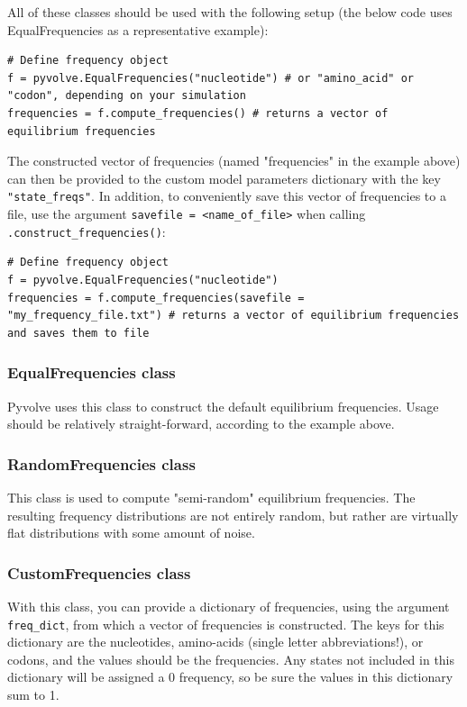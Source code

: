 \documentclass{article}
\newcommand{\code}[1]{\texttt{\small{#1}}}
\begin{document}
All of these classes should be used with the following setup (the below code uses EqualFrequencies as a representative example):
\begin{lstlisting}
# Define frequency object
f = pyvolve.EqualFrequencies("nucleotide") # or "amino_acid" or "codon", depending on your simulation
frequencies = f.compute_frequencies() # returns a vector of equilibrium frequencies
\end{lstlisting}

The constructed vector of frequencies (named "frequencies" in the example above) can then be provided to the custom model parameters dictionary with the key \code{"state\_freqs"}. In addition, to conveniently save this vector of frequencies to a file, use the argument \code{savefile = <name\_of\_file>} when calling \code{.construct\_frequencies()}:
\begin{lstlisting}
# Define frequency object
f = pyvolve.EqualFrequencies("nucleotide")
frequencies = f.compute_frequencies(savefile = "my_frequency_file.txt") # returns a vector of equilibrium frequencies and saves them to file
\end{lstlisting}


\subsubsection{EqualFrequencies class}
Pyvolve uses this class to construct the default equilibrium frequencies. Usage should be relatively straight-forward, according to the example above.

\subsubsection{RandomFrequencies class}
This class is used to compute "semi-random" equilibrium frequencies. The resulting frequency distributions are not entirely random, but rather are virtually flat distributions with some amount of noise.

\subsubsection{CustomFrequencies class}
With this class, you can provide a dictionary of frequencies, using the argument \code{freq\_dict}, from which a vector of frequencies is constructed. The keys for this dictionary are the nucleotides, amino-acids (single letter abbreviations!), or codons, and the values should be the frequencies. Any states not included in this dictionary will be assigned a 0 frequency, so be sure the values in this dictionary sum to 1.
\end{document}
